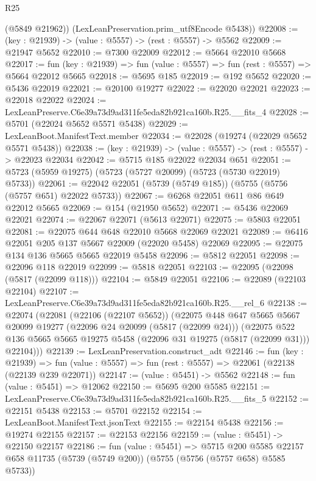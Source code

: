 \begin{lexlean}{R25}
\begin{coremodule}
        (@5849 @21962))
      (LexLeanPreservation.prim_utf8Encode @5438))
@22008 := (key : @21939) -> (value : @5557) -> (rest : @5557) -> @5562
@22009 := @21947 @5652
@22010 := @7300 @22009
@22012 := @5664 @22010 @5668
@22017 := fun (key : @21939) => fun (value : @5557) => fun (rest : @5557) => @5664 @22012 @5665
@22018 := @5695 @185
@22019 := @192 @5652
@22020 := @5436 @22019
@22021 := @20100 @19277
@22022 := @22020 @22021
@22023 := @22018 @22022
@22024 := LexLeanPreserve.C6e39a73d9ad311fe5eda82b921ca160b.R25.__fits_4
@22028 := @5701 (@22024 @5652 @5571 @5438)
@22029 := LexLeanBoot.ManifestText.member
@22034 := @22028 (@19274 (@22029 @5652 @5571 @5438))
@22038 := (key : @21939) -> (value : @5557) -> (rest : @5557) -> @22023 @22034
@22042 := @5715 @185 @22022 @22034 @651
@22051 := @5723 (@5959 @19275) (@5723 (@5727 @20099) (@5723 (@5730 @22019) @5733))
@22061 := @22042 @22051 (@5739 (@5749 @185)) (@5755 (@5756 (@5757 @651) @22022 @5733))
@22067 := @6268 @22051 @611 @86 @649 @22012 @5665
@22069 := @154 (@21950 @5652)
@22071 := @5436 @22069 @22021
@22074 := @22067 @22071 (@5613 @22071)
@22075 := @5803 @22051
@22081 := @22075 @644 @648 @22010 @5668 @22069 @22021
@22089 := @6416 @22051 @205 @137 @5667 @22009 (@22020 @5458) @22069
@22095 := @22075 @134 @136 @5665 @5665 @22019 @5458
@22096 := @5812 @22051
@22098 := @22096 @118 @22019
@22099 := @5818 @22051
@22103 := @22095 (@22098 (@5817 (@22099 @118)))
@22104 := @5849 @22051
@22106 := @22089 (@22103 @22104)
@22107 := LexLeanPreserve.C6e39a73d9ad311fe5eda82b921ca160b.R25.__rel_6
@22138 := @22074
    (@22081
      (@22106 (@22107 @5652))
      (@22075
        @448
        @647
        @5665
        @5667
        @20099
        @19277
        (@22096 @24 @20099 (@5817 (@22099 @24)))
        (@22075
          @522
          @136
          @5665
          @5665
          @19275
          @5458
          (@22096 @31 @19275 (@5817 (@22099 @31)))
          @22104)))
@22139 := LexLeanPreservation.construct_adt
@22146 := fun (key : @21939) =>
  fun (value : @5557) => fun (rest : @5557) => @22061 (@22138 (@22139 @239 @22071))
@22147 := (value : @5451) -> @5562
@22148 := fun (value : @5451) => @12062
@22150 := @5695 @200 @5585
@22151 := LexLeanPreserve.C6e39a73d9ad311fe5eda82b921ca160b.R25.__fits_5
@22152 := @22151 @5438
@22153 := @5701 @22152
@22154 := LexLeanBoot.ManifestText.jsonText
@22155 := @22154 @5438
@22156 := @19274 @22155
@22157 := @22153 @22156
@22159 := (value : @5451) -> @22150 @22157
@22186 := fun (value : @5451) =>
  @5715
    @200
    @5585
    @22157
    @658
    @11735
    (@5739 (@5749 @200))
    (@5755 (@5756 (@5757 @658) @5585 @5733))

\end{coremodule}
\end{lexlean}
